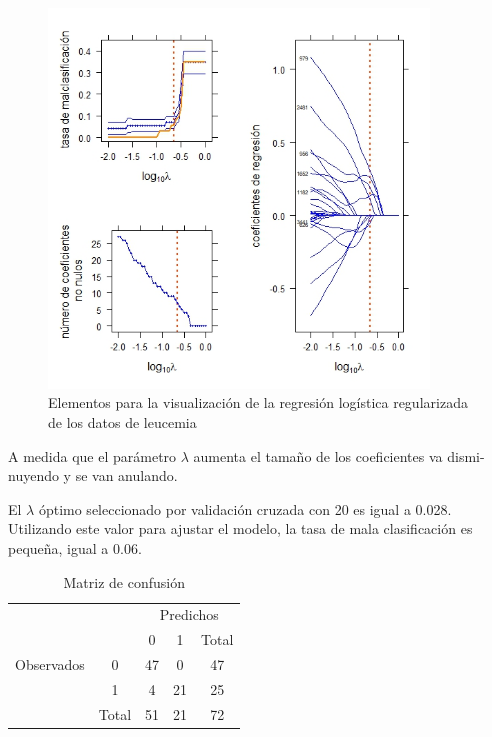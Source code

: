 \documentclass{report}
\begin{document}
\begin{figure} [h]	\centering	\includegraphics[width=0.9\textwidth]{leukemia_graficos}	\caption{ Elementos para la visualización de la regresión logística regularizada de los datos de leucemia}	
	\label{leukemia_graficos}
\end{figure}


A medida que el parámetro  $\lambda$ aumenta el tamaño de los coeficientes va dismi-\- nuyendo y se van anulando. 


El $\lambda$  óptimo seleccionado por validación cruzada con 20 es igual  a 0.028. Utilizando este valor para ajustar el modelo,  la tasa de mala clasificación  es pequeña, igual a  0.06.



\begin{table}
	\centering 
\begin{tabular}{cc|cc|c}
	\hline & & \multicolumn{3}{|c}{ Predichos } \\
	& & 0 & 1 & Total \\
	\hline Observados & 0 & 47 & 0 & 47 \\
  & 1 & 4 & 21 & 25 \\
	\cline { 2 - 5 } & Total & 51 & 21 & 72 \\
	\hline
\end{tabular}
\caption{Matriz de confusión }
\end{table}


\end{document}
